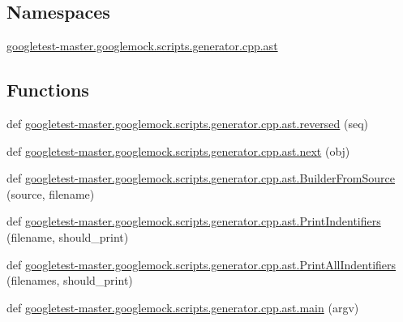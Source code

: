 \subsection*{Namespaces}
\begin{DoxyCompactItemize}
\item 
 \mbox{\hyperlink{namespacegoogletest-master_1_1googlemock_1_1scripts_1_1generator_1_1cpp_1_1ast}{googletest-\/master.\+googlemock.\+scripts.\+generator.\+cpp.\+ast}}
\end{DoxyCompactItemize}
\subsection*{Functions}
\begin{DoxyCompactItemize}
\item 
def \mbox{\hyperlink{namespacegoogletest-master_1_1googlemock_1_1scripts_1_1generator_1_1cpp_1_1ast_a5bc80d9e631b79b8f9cfb85866756a2a}{googletest-\/master.\+googlemock.\+scripts.\+generator.\+cpp.\+ast.\+reversed}} (seq)
\item 
def \mbox{\hyperlink{namespacegoogletest-master_1_1googlemock_1_1scripts_1_1generator_1_1cpp_1_1ast_a6a5e5e3a595b966d8c3d9b680e6cce11}{googletest-\/master.\+googlemock.\+scripts.\+generator.\+cpp.\+ast.\+next}} (obj)
\item 
def \mbox{\hyperlink{namespacegoogletest-master_1_1googlemock_1_1scripts_1_1generator_1_1cpp_1_1ast_adcd0774157b12ae0b5909027f94f42db}{googletest-\/master.\+googlemock.\+scripts.\+generator.\+cpp.\+ast.\+Builder\+From\+Source}} (source, filename)
\item 
def \mbox{\hyperlink{namespacegoogletest-master_1_1googlemock_1_1scripts_1_1generator_1_1cpp_1_1ast_a05c422b1ca9c409a6d70a3d92187122b}{googletest-\/master.\+googlemock.\+scripts.\+generator.\+cpp.\+ast.\+Print\+Indentifiers}} (filename, should\+\_\+print)
\item 
def \mbox{\hyperlink{namespacegoogletest-master_1_1googlemock_1_1scripts_1_1generator_1_1cpp_1_1ast_a978afb44b3d193293060f3c70f7aae31}{googletest-\/master.\+googlemock.\+scripts.\+generator.\+cpp.\+ast.\+Print\+All\+Indentifiers}} (filenames, should\+\_\+print)
\item 
def \mbox{\hyperlink{namespacegoogletest-master_1_1googlemock_1_1scripts_1_1generator_1_1cpp_1_1ast_a5e6b4b1ad5f93de0fb81309194ed4e1c}{googletest-\/master.\+googlemock.\+scripts.\+generator.\+cpp.\+ast.\+main}} (argv)
\end{DoxyCompactItemize}
